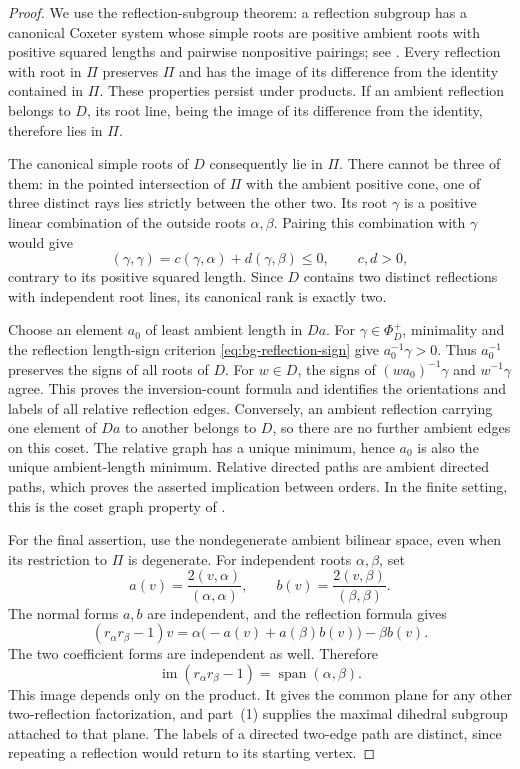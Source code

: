 \begin{proof}
We use the reflection-subgroup theorem: a reflection subgroup has a
canonical Coxeter system whose simple roots are positive ambient roots
with positive squared lengths and pairwise nonpositive pairings;
see \cite{Deodhar89,Dyer90,Dyer91,Dyer93}.  Every reflection with root in $\Pi$ preserves
$\Pi$ and has the image of its difference from the identity contained
in $\Pi$.  These properties persist under products.  If an ambient
reflection belongs to $D$, its root line, being the image of its
difference from the identity, therefore lies in $\Pi$.

The canonical simple roots of $D$ consequently lie in $\Pi$.  There
cannot be three of them: in the pointed intersection of $\Pi$ with
the ambient positive cone, one of three distinct rays lies strictly
between the other two.  Its root $\gamma$ is a positive linear
combination of the outside roots $\alpha,\beta$.  Pairing this
combination with $\gamma$ would give
\[
 (\gamma,\gamma)
 =c(\gamma,\alpha)+d(\gamma,\beta)\le0,
 \qquad c,d>0,
\]
contrary to its positive squared length.  Since $D$ contains two
distinct reflections with independent root lines, its canonical
rank is exactly two.

Choose an element $a_0$ of least ambient length in $D a$.  For
$\gamma\in\Phi_D^+$, minimality and the reflection length-sign
criterion \eqref{eq:bg-reflection-sign} give $a_0^{-1}\gamma>0$. Thus $a_0^{-1}$ preserves the
signs of all roots of $D$.  For $w\in D$, the signs of
$(wa_0)^{-1}\gamma$ and $w^{-1}\gamma$ agree.  This proves the
inversion-count formula and identifies the orientations and labels
of all relative reflection edges.  Conversely, an ambient reflection
carrying one element of $D a$ to another belongs to $D$, so there are
no further ambient edges on this coset.  The relative graph has a
unique minimum, hence $a_0$ is also the unique ambient-length minimum.
Relative directed paths are ambient directed paths, which proves
the asserted implication between orders. In the finite setting, this is
the coset graph property of \cite[Theorem~1.4]{Dyer91}.

For the final assertion, use the nondegenerate ambient bilinear
space, even when its restriction to $\Pi$ is degenerate.  For
independent roots $\alpha,\beta$, set
\[
 a(v)=\frac{2(v,\alpha)}{(\alpha,\alpha)},
 \qquad
 b(v)=\frac{2(v,\beta)}{(\beta,\beta)}.
\]
The normal forms $a,b$ are independent, and the reflection formula
gives
\[
 (r_\alpha r_\beta-1)v
 =\alpha\bigl(-a(v)+a(\beta)b(v)\bigr)-\beta b(v).
\]
The two coefficient forms are independent as well.  Therefore
\[
 \operatorname{im}(r_\alpha r_\beta-1)
 =\operatorname{span}(\alpha,\beta).
\]
This image depends only on the product.  It gives the common plane
for any other two-reflection factorization, and part~(1) supplies
the maximal dihedral subgroup attached to that plane.  The labels
of a directed two-edge path are distinct, since repeating a
reflection would return to its starting vertex.
\end{proof}

